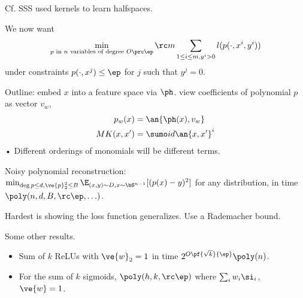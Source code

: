Cf. SSS used kernels to learn halfspaces.

We now want 
$$
\min_{p\text{ in }n\text{ variables of degree }O\prc\ep} \rc m \sum_{1\le i\le m, y^i>0} l(p(\cdot, x^i, y^i))
$$
under constraints $p(\cdot, x^j)\le \ep$ for $j$ such that $y^j=0$.


Outline: embed $x$ into a feature space via $\ph$. view coefficients of polynomial $p$ as vector $v_w$, 
\begin{align}
p_w(x) &= \an{\ph(x), v_w}\\
MK(x,x') &= \sumo id \an{x,x'}^i
\end{align}•
Different orderings of monomials will be different terms. 

Noisy polynomial reconstruction: $\min_{\deg p\le d, \ve{p}_2^2\le B}\E_{(x,y)\sim D, x\sim \bS^{n-1}} [(p(x)-y)^2]$ for any distribution, in time $\poly(n, d, B, \rc \ep,\ldots)$. 


Hardest is showing the loss function generalizes. Use a Rademacher bound. 

Some other results.
\begin{itemize}
\item
Sum of $k$ ReLUs with $\ve{w}_2=1$ in time $2^{O\pf{\sqrt k}{\ep}}\poly(n)$. 
\item
For the sum of $k$ sigmoids, $\poly(h,k,\rc \ep)$ where $\sum_i w_i\si_i$, $\ve{w}=1$. 
\end{itemize}



\printbibliography
